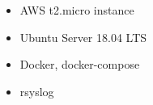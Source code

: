 \documentclass[12pt]{article}
\renewcommand{\_}{\kern-1.5pt\textunderscore\kern-1.5pt}
\begin{document}
\begin{itemize}
	\item AWS t2.micro instance\par

	\item {\fontsize{11pt}{13.2pt}\selectfont \textcolor[HTML]{444444}{Ubuntu Server 18.04 LTS}\par}\par

	\item {\fontsize{11pt}{13.2pt}\selectfont \textcolor[HTML]{444444}{Docker, docker-compose}\par}\par

	\item {\fontsize{11pt}{13.2pt}\selectfont \textcolor[HTML]{444444}{rsyslog}\par}
\end{itemize}\par


\vspace{\baselineskip}

\vspace{\baselineskip}

\printbibliography
\end{document}
